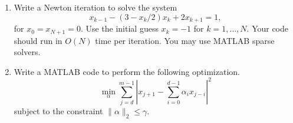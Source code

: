 \documentclass[12pt, leqno]{article}
\begin{document}
\begin{enumerate}
\item
  Write a Newton iteration to solve the system
  \[
    x_{k-1} - (3-x_k/2) x_k + 2 x_{k+1} = 1,
  \]
  for $x_0 = x_{N+1} = 0$.  Use the initial guess
  $x_k = -1$ for $k=1, \ldots, N$.
  Your code should run in $O(N)$ time per iteration.
  You may use MATLAB sparse solvers.

\item
  Write a MATLAB code to perform the following optimization.
  \[
    \min_{\alpha} \sum_{j=d}^{m-1} \left|x_{j+1}-\sum_{i=0}^{d-1} \alpha_i x_{j-i}\right|^2
  \]
  subject to the constraint $\|\alpha\|_2 \leq \gamma$.

\end{enumerate}
\end{document}
